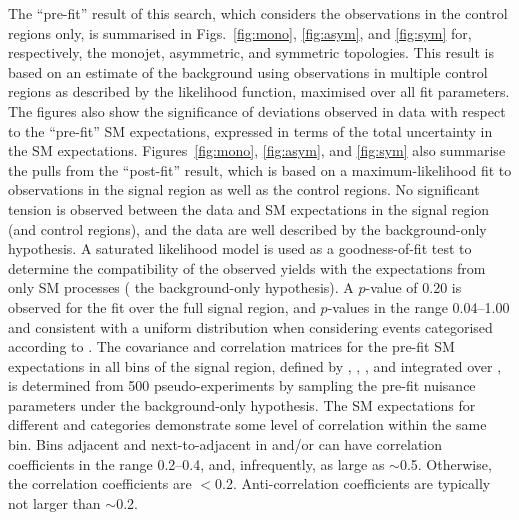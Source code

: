 The ``pre-fit'' result of this search, which considers the
observations in the control regions only, is summarised in
Figs.~\ref{fig:mono}, \ref{fig:asym}, and \ref{fig:sym} for,
respectively, the monojet, asymmetric, and symmetric topologies. This
result is based on an estimate of the \znunuj background using
observations in multiple control regions as described by the
likelihood function, maximised over all fit parameters. The figures
also show the significance of deviations observed in data with respect
to the ``pre-fit'' SM expectations, expressed in terms of the total
uncertainty in the SM expectations. Figures~\ref{fig:mono},
\ref{fig:asym}, and \ref{fig:sym} also summarise the pulls from the
``post-fit'' result, which is based on a maximum-likelihood fit to
observations in the signal region as well as the control regions. No
significant tension is observed between the data and SM expectations
in the signal region (and control regions), and the data are well
described by the background-only hypothesis. A saturated likelihood
model%
is used as a goodness-of-fit test to determine the compatibility of
the observed yields with the expectations from only SM processes (\ie
the background-only hypothesis). A $p$-value of 0.20 is observed for
the fit over the full signal region, and $p$-values in the range
0.04--1.00 and consistent with a uniform distribution when considering
events categorised according to \njet. 
The covariance and correlation matrices for the pre-fit SM
expectations in all bins of the signal region, defined by \njet, \nb,
\scalht, and integrated over \HTmiss, is determined from 500
pseudo-experiments by sampling the pre-fit nuisance parameters under
the background-only hypothesis. The SM expectations for different
\njet and \nb categories demonstrate some level of correlation within
the same \scalht bin. Bins adjacent and next-to-adjacent in \njet
and/or \nb can have correlation coefficients in the range 0.2--0.4,
and, infrequently, as large as $\sim$0.5. Otherwise, the correlation
coefficients are $<$0.2. Anti-correlation coefficients are typically
not larger than $\sim$0.2.


%
%
%

